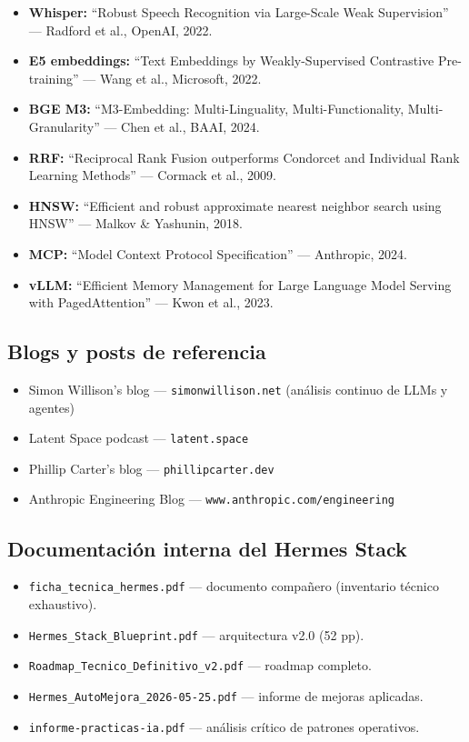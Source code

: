 \documentclass[11pt,a4paper]{article}
\begin{document}
\begin{itemize}[leftmargin=*,itemsep=1pt]
\item \textbf{Whisper:} ``Robust Speech Recognition via Large-Scale Weak Supervision'' — Radford et al., OpenAI, 2022.
\item \textbf{E5 embeddings:} ``Text Embeddings by Weakly-Supervised Contrastive Pre-training'' — Wang et al., Microsoft, 2022.
\item \textbf{BGE M3:} ``M3-Embedding: Multi-Linguality, Multi-Functionality, Multi-Granularity'' — Chen et al., BAAI, 2024.
\item \textbf{RRF:} ``Reciprocal Rank Fusion outperforms Condorcet and Individual Rank Learning Methods'' — Cormack et al., 2009.
\item \textbf{HNSW:} ``Efficient and robust approximate nearest neighbor search using HNSW'' — Malkov \& Yashunin, 2018.
\item \textbf{MCP:} ``Model Context Protocol Specification'' — Anthropic, 2024.
\item \textbf{vLLM:} ``Efficient Memory Management for Large Language Model Serving with PagedAttention'' — Kwon et al., 2023.
\end{itemize}

\subsection{Blogs y posts de referencia}

\begin{itemize}[leftmargin=*,itemsep=1pt]
\item Simon Willison's blog — \texttt{simonwillison.net} (análisis continuo de LLMs y agentes)
\item Latent Space podcast — \texttt{latent.space}
\item Phillip Carter's blog — \texttt{phillipcarter.dev}
\item Anthropic Engineering Blog — \texttt{www.anthropic.com/engineering}
\end{itemize}

\subsection{Documentación interna del Hermes Stack}

\begin{itemize}[leftmargin=*,itemsep=1pt]
\item \texttt{ficha\_tecnica\_hermes.pdf} — documento compañero (inventario técnico exhaustivo).
\item \texttt{Hermes\_Stack\_Blueprint.pdf} — arquitectura v2.0 (52 pp).
\item \texttt{Roadmap\_Tecnico\_Definitivo\_v2.pdf} — roadmap completo.
\item \texttt{Hermes\_AutoMejora\_2026-05-25.pdf} — informe de mejoras aplicadas.
\item \texttt{informe-practicas-ia.pdf} — análisis crítico de patrones operativos.
\end{itemize}
\end{document}
